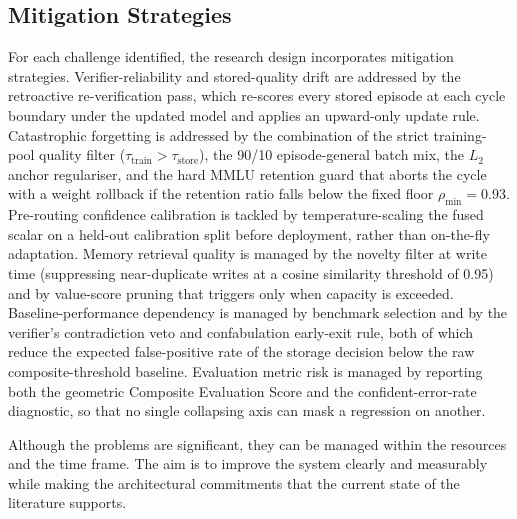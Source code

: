 \subsection{Mitigation Strategies}

For each challenge identified, the research design incorporates mitigation strategies. Verifier-reliability and stored-quality drift are addressed by the retroactive re-verification pass, which re-scores every stored episode at each cycle boundary under the updated model and applies an upward-only update rule. Catastrophic forgetting is addressed by the combination of the strict training-pool quality filter ($\tau_{\text{train}} > \tau_{\text{store}}$), the 90/10 episode-general batch mix, the $L_2$ anchor regulariser, and the hard MMLU retention guard that aborts the cycle with a weight rollback if the retention ratio falls below the fixed floor $\rho_{\min} = 0.93$. Pre-routing confidence calibration is tackled by temperature-scaling the fused scalar on a held-out calibration split before deployment, rather than on-the-fly adaptation. Memory retrieval quality is managed by the novelty filter at write time (suppressing near-duplicate writes at a cosine similarity threshold of 0.95) and by value-score pruning that triggers only when capacity is exceeded. Baseline-performance dependency is managed by benchmark selection and by the verifier's contradiction veto and confabulation early-exit rule, both of which reduce the expected false-positive rate of the storage decision below the raw composite-threshold baseline. Evaluation metric risk is managed by reporting both the geometric Composite Evaluation Score and the confident-error-rate diagnostic, so that no single collapsing axis can mask a regression on another.

Although the problems are significant, they can be managed within the resources and the time frame. The aim is to improve the system clearly and measurably while making the architectural commitments that the current state of the literature supports.